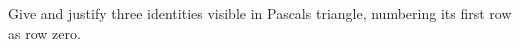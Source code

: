 Give and justify three identities visible in Pascal\textquotesingle s triangle, numbering its first row as row zero.
